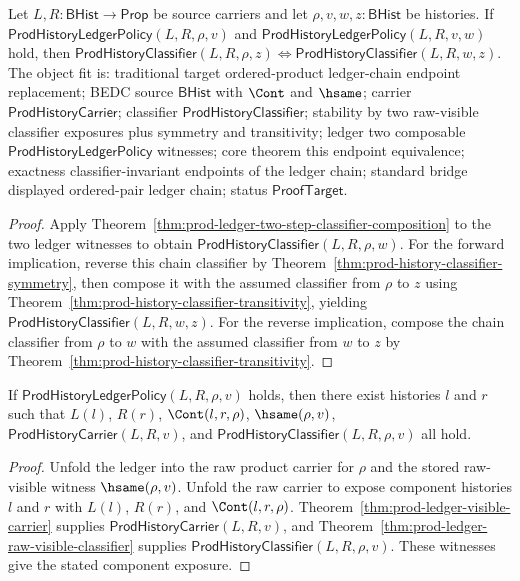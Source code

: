 \begin{theorem}
\label{thm:prod-ledger-two-step-classifier-endpoint-equivalence}
Let $L,R:\mathsf{BHist}\to\mathsf{Prop}$ be source carriers and let
$\rho,v,w,z:\mathsf{BHist}$ be histories. If
$\mathsf{ProdHistoryLedgerPolicy}(L,R,\rho,v)$ and
$\mathsf{ProdHistoryLedgerPolicy}(L,R,v,w)$ hold, then
$\mathsf{ProdHistoryClassifier}(L,R,\rho,z) \Longleftrightarrow
\mathsf{ProdHistoryClassifier}(L,R,w,z)$. The object fit is: traditional
target ordered-product ledger-chain endpoint replacement; BEDC source
$\mathsf{BHist}$ with $\Cont$ and $\hsame$; carrier
$\mathsf{ProdHistoryCarrier}$; classifier $\mathsf{ProdHistoryClassifier}$;
stability by two raw-visible classifier exposures plus symmetry and
transitivity; ledger two composable
$\mathsf{ProdHistoryLedgerPolicy}$ witnesses; core theorem this endpoint
equivalence; exactness classifier-invariant endpoints of the ledger chain;
standard bridge displayed ordered-pair ledger chain; status
$\mathsf{ProofTarget}$.
\end{theorem}
\begin{proof}
Apply Theorem~\ref{thm:prod-ledger-two-step-classifier-composition} to the two
ledger witnesses to obtain
$\mathsf{ProdHistoryClassifier}(L,R,\rho,w)$. For the forward implication,
reverse this chain classifier by
Theorem~\ref{thm:prod-history-classifier-symmetry}, then compose it with the
assumed classifier from $\rho$ to $z$ using
Theorem~\ref{thm:prod-history-classifier-transitivity}, yielding
$\mathsf{ProdHistoryClassifier}(L,R,w,z)$. For the reverse implication,
compose the chain classifier from $\rho$ to $w$ with the assumed classifier
from $w$ to $z$ by
Theorem~\ref{thm:prod-history-classifier-transitivity}.
\end{proof}

\begin{theorem}
\label{thm:prod-ledger-component-exposure}
If $\mathsf{ProdHistoryLedgerPolicy}(L,R,\rho,v)$ holds, then there exist histories $l$ and $r$ such that $L(l)$, $R(r)$, $\Cont(l,r,\rho)$, $\hsame(\rho,v)$, $\mathsf{ProdHistoryCarrier}(L,R,v)$, and $\mathsf{ProdHistoryClassifier}(L,R,\rho,v)$ all hold.
\end{theorem}
\begin{proof}
Unfold the ledger into the raw product carrier for $\rho$ and the stored raw-visible witness $\hsame(\rho,v)$. Unfold the raw carrier to expose component histories $l$ and $r$ with $L(l)$, $R(r)$, and $\Cont(l,r,\rho)$. Theorem~\ref{thm:prod-ledger-visible-carrier} supplies $\mathsf{ProdHistoryCarrier}(L,R,v)$, and Theorem~\ref{thm:prod-ledger-raw-visible-classifier} supplies $\mathsf{ProdHistoryClassifier}(L,R,\rho,v)$. These witnesses give the stated component exposure.
\end{proof}

